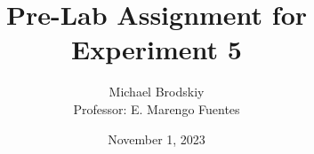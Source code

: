 


\title{Pre-Lab Assignment for Experiment 5}
\date{November 1, 2023}
\author{Michael Brodskiy\\ \small Professor: E. Marengo Fuentes}



\maketitle

